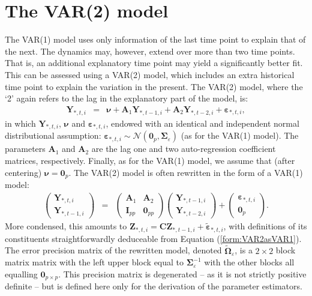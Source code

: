 \section{The VAR(2) model}
The VAR(1) model uses only information of the last time point to explain that of the next. The dynamics may, however, extend over more than two time points. That is, an additional explanatory time point may yield a significantly better fit. This can be assessed using a VAR(2) model, which includes an extra historical time point to explain the variation in the present. The VAR(2) model, where the `2' again refers to the lag in the explanatory part of the model, is:
\begin{eqnarray*}
\mathbf{Y}_{*,t,i}  & = & \boldsymbol{\nu} + \mathbf{A}_1 \mathbf{Y}_{*,t-1,i} + \mathbf{A}_2 \mathbf{Y}_{*,t-2,i} + \boldsymbol{\varepsilon}_{*,t,i},
\end{eqnarray*}
in which $\mathbf{Y}_{*,t,i}$, $\boldsymbol{\nu}$ and $\boldsymbol{\varepsilon}_{*,t,i}$, endowed with an identical and independent normal distributional assumption: $\boldsymbol{\varepsilon}_{*,t,i} \sim \mathcal{N}( \mathbf{0}_{p}, \mathbf{\Sigma}_{\varepsilon})$ (as for the VAR(1) model). The parameters $\mathbf{A}_1$ and $\mathbf{A}_2$ are the lag one and two auto-regression coefficient matrices, respectively. Finally, as for the VAR(1) model, we assume that (after centering) $\boldsymbol{\nu} = \mathbf{0}_{p}$. The VAR(2) model is often rewritten in the form of a VAR(1) model:
\begin{eqnarray} \label{form:VAR2asVAR1}
\left(\begin{array}{l} \mathbf{Y}_{*,t,i} \\ \mathbf{Y}_{*,t-1,i}  \end{array} \right) & = & \left( \begin{array}{ll} \mathbf{A}_1 & \mathbf{A}_2 \\ \mathbf{I}_{pp} & \mathbf{0}_{pp} \end{array} \right) \left( \begin{array}{l} \mathbf{Y}_{*,t-1,i} \\ \mathbf{Y}_{*,t-2,i}  \end{array} \right) + \left( \begin{array}{l}  \boldsymbol{\varepsilon}_{*,t,i}
\\ \mathbf{0}_{p} \end{array} \right).
\end{eqnarray}
More condensed, this amounts to $\mathbf{Z}_{*,t,i}  =  \mathbf{C} \mathbf{Z}_{*,t-1,i} +  \tilde{\boldsymbol{\varepsilon}}_{*,t,i}$, 
with definitions of its constituents straightforwardly deduceable from Equation (\ref{form:VAR2asVAR1}). The error precision matrix of the rewritten model, denoted $\tilde{\mathbf{\Omega}}_{\varepsilon}$, is a $2\times 2$ block matrix matrix with the left upper block equal to $\mathbf{\Sigma}_{\varepsilon}^{-1}$ with the other blocks all equalling $\mathbf{0}_{p \times p}$. This precision matrix is degenerated -- as it is not strictly positive definite -- but is defined here only for the derivation of the parameter estimators.


